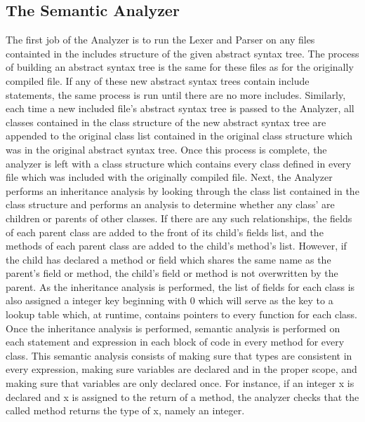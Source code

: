 \begin{homeworkProblem}
	\subsection{The Semantic Analyzer}
    The first job of the Analyzer is to run the Lexer and Parser on any files containted in the includes structure of the given abstract syntax tree. The process of building an abstract syntax tree is the same for these files as for the originally compiled file. If any of these new abstract syntax trees contain include statements, the same process is run until there are no more includes. Similarly, each time a new included file's abstract syntax tree is passed to the Analyzer, all classes contained in the class structure of the new abstract syntax tree are appended to the original class list contained in the original class structure which was in the original abstract syntax tree. Once this process is complete, the analyzer is left with a class structure which contains every class defined in every file which was included with the originally compiled file.
    Next, the Analyzer performs an inheritance analysis by looking through the class list contained in the class structure and performs an analysis to determine whether any class' are children or parents of other classes. If there are any such relationships, the fields of each parent class are added to the front of its child's fields list, and the methods of each parent class are added to the child's method's list. However, if the child has declared a method or field which shares the same name as the parent's field or method, the child's field or method is not overwritten by the parent. As the inheritance analysis is performed, the list of fields for each class is also assigned a integer key beginning with 0 which will serve as the key to a lookup table which, at runtime, contains pointers to every function for each class.
    Once the inheritance analysis is performed, semantic analysis is performed on each statement and expression in each block of code in every method for every class. This semantic analysis consists of making sure that types are consistent in every expression, making sure variables are declared and in the proper scope, and making sure that variables are only declared once. For instance, if an integer x is declared and x is assigned to the return of a method, the analyzer checks that the called method returns the type of x, namely an integer.

\end{homeworkProblem}
